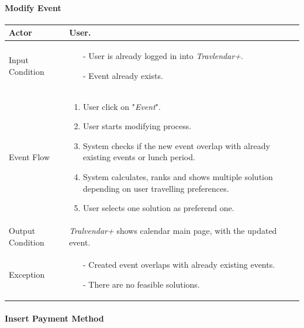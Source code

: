 
	\paragraph{Modify Event}
	
		\begin{tabular}{| l | p{} | }
			\hline
			\hline
			Actor	&		User. \\
			\hline
			Input Condition		&		\begin{itemize}
													\item[-] User is already logged in into \textit{Travlendar+}.
													\item[-] Event already exists.
												\end{itemize} \\
			\hline
			Event Flow		&		\begin{enumerate}
												\item User click on "\textit{Event}".
												\item User starts modifying process.
												\item System checks if the new event overlap with already existing events or lunch period.
												\item	 System calculates, ranks and shows multiple solution depending on user travelling preferences.
												\item User selects one solution as preferend one.
											\end{enumerate} \\
			\hline
			Output Condition		&		\textit{Tralvendar+} shows calendar main page, with the updated event. \\
			\hline		
			Exception		&		\begin{itemize}
											\item[-] Created event overlaps with already existing events.
											\item[-] There are no feasible solutions.
										\end{itemize} \\
			\hline
			\hline
		\end{tabular}
		
		

	\paragraph{Insert Payment Method}
	
